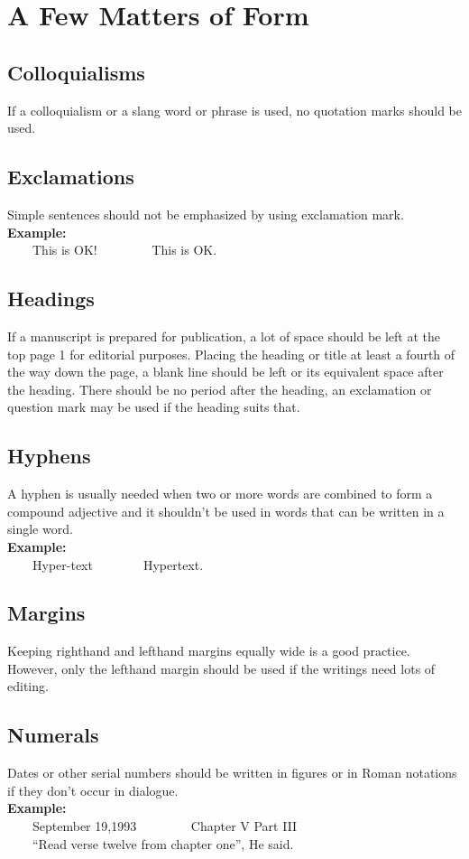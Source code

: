 \documentclass[12pt]{report}
\newcommand{\xmpl}{\textbf{Example:}\\} %
\newcommand{\indnt}{\ \ \ \ } %
\begin{document}
\chapter{A Few Matters of Form}
\section{Colloquialisms}
If a colloquialism or a slang word or phrase is used, no quotation marks should be used.

\section{Exclamations}
Simple sentences should not be emphasized by using exclamation mark.\\
\xmpl
\indnt This is OK! \indnt \indnt This is OK.

\section{Headings}
If a manuscript is prepared for publication, a lot of space should be left at the top page 1 for editorial purposes. Placing the heading or title at least a fourth of the way down the page, a blank line should be left or its equivalent space after the heading. There should be no period after the heading, an exclamation or question mark may be used if the heading suits that.

\section{Hyphens}
A hyphen is usually needed when two or more words are combined to form a compound adjective and it shouldn't be used in words that can be written in a single word.\\
\xmpl
\indnt Hyper-text\indnt \indnt Hypertext.
\section{Margins}
Keeping righthand and lefthand margins equally wide is a good practice. However, only the lefthand margin should be used if the writings need lots of editing.
\section{Numerals}
Dates or other serial numbers should be written in figures or in Roman notations if they don't occur in dialogue.\\
\xmpl
\indnt September 19,1993 \indnt \indnt Chapter V Part III\\
\indnt ``Read verse twelve from chapter one'', He said.
\end{document}
